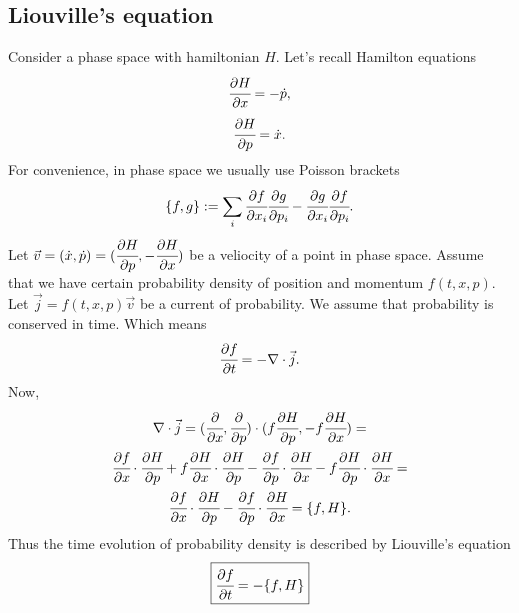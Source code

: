 \documentclass[main.tex]{subfiles}
\begin{document}
\subsection{Liouville's equation}
\label{liouville-equation}
Consider a phase space with hamiltonian $H$. Let's recall Hamilton equations
\begin{equation}
\cfrac{\partial H}{\partial x} = -\dot{p},
\end{equation}
\begin{equation}
\cfrac{\partial H}{\partial p} = \dot{x}.
\end{equation}
For convenience, in phase space we usually use Poisson brackets
\begin{equation}
\{f, g\} := \sum_i \cfrac{\partial f}{\partial x_i}\cfrac{\partial g}{\partial p_i} - \cfrac{\partial g}{\partial x_i}\cfrac{\partial f}{\partial p_i}. 
\end{equation}
Let $\vec{v} = (\dot{x}, \dot{p}) = (\cfrac{\partial H}{\partial p}, -\cfrac{\partial H}{\partial x})$ be a veliocity of a point in phase space. Assume that we have certain probability density of position and momentum $f(t, x, p)$.
Let $\vec{j} = f(t, x, p) \vec{v}$ be a current of probability. We assume that probability is conserved in time. Which means
\begin{equation}
\cfrac{\partial f}{\partial t} = -\nabla \cdot \vec{j}.
\end{equation}
Now,
\begin{multline}
\nabla \cdot \vec{j} = (\cfrac{\partial}{\partial x}, \cfrac{\partial}{\partial p}) \cdot (f\cfrac{\partial H}{\partial p}, -f\cfrac{\partial H}{\partial x}) = \\
\cfrac{\partial f}{\partial x} \cdot\cfrac{\partial H}{\partial p} + f\cfrac{\partial H}{\partial x} \cdot \cfrac{\partial H}{\partial p} - \cfrac{\partial f}{\partial p} \cdot\cfrac{\partial H}{\partial x} - f\cfrac{\partial H}{\partial p} \cdot \cfrac{\partial H}{\partial x} = \\
\cfrac{\partial f}{\partial x} \cdot\cfrac{\partial H}{\partial p} - \cfrac{\partial f}{\partial p} \cdot\cfrac{\partial H}{\partial x} =
\{f, H\}.
\end{multline}
Thus the time evolution of probability density is described by Liouville's equation
\begin{equation}
\boxed{
\cfrac{\partial f}{\partial t} = - \{f, H\}
}
\end{equation}
\end{document}
